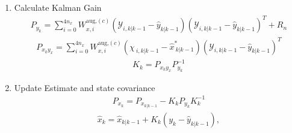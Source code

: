 \begin{enumerate}
    \item Calculate Kalman Gain
    \begin{align*}
        P_{y_{k}} = \sum_{i=0}^{4n_{x}} W^{\text{aug,}(c)}_{x,i} (\mathcal{Y}_{i, k|k-1} - \hat{y}_{k|k-1})(\mathcal{Y}_{i, k|k-1} - \hat{y}_{k|k-1})^{T} + R_{n}   %
        \end{align*}
        \begin{align*}
        P_{x_{k}y_{x}} = \sum_{i=0}^{4n_{x}} W^{\text{aug,}(c)}_{x,i} (\chi_{\ i, k|k-1} - \hat{x}^{*}_{\ k|k-1})(\mathcal{Y}_{i, k|k-1} - \hat{y}_{k|k-1})^{T} 
        \end{align*}
        \begin{align*}
        K_{k} = P_{x_{k}y_{x}}P^{-1}_{y_{k}}
    \end{align*}
    \item Update Estimate and state covariance
   \begin{align*}
        P_{x_{k}} = P_{x_{k|k-1}} - K_{k}P_{y_{k}}K^{-1}_{k} 
   \end{align*}
    \begin{align*}
        \hat{x}_{k} = \hat{x}_{k|k-1} + K_{k}(y_{k}-\hat{y}_{k|k-1}),
    \end{align*}
    
\end{enumerate}